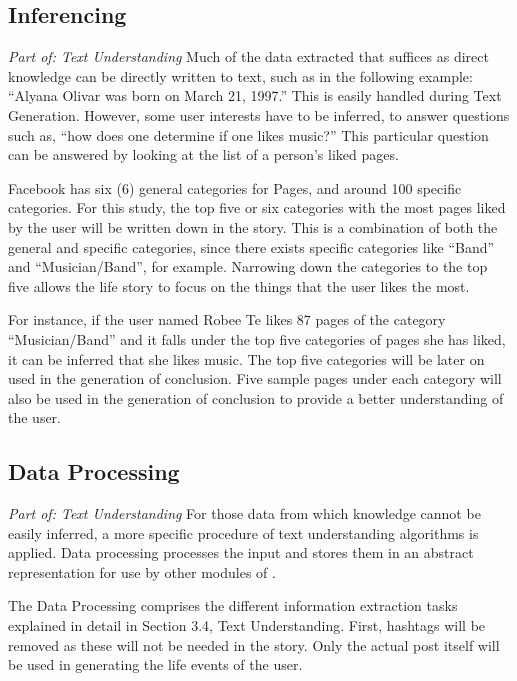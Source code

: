 \clearpage
\subsection{Inferencing}
\textit{Part of: Text Understanding} \newline \newline
Much of the data extracted that suffices as direct knowledge can be directly written to text, such as in the following example: ``Alyana Olivar was born on March 21, 1997.'' This is easily handled during Text Generation. However, some user interests have to be inferred, to answer questions such as, ``how does one determine if one likes music?'' This particular question can be answered by looking at the list of a person's liked pages.

Facebook has six (6) general categories for Pages, and around 100 specific categories. For this study, the top five or six categories with the most pages liked by the user will be written down in the story. This is a combination of both the general and specific categories, since there exists specific categories like ``Band'' and ``Musician/Band'', for example. Narrowing down the categories to the top five allows the life story to focus on the things that the user likes the most.

For instance, if the user named Robee Te likes 87 pages of the category ``Musician/Band'' and it falls under the top five categories of pages she has liked, it can be inferred that she likes music. The top five categories will be later on used in the generation of conclusion. Five sample pages under each category will also be used in the generation of conclusion to provide a better understanding of the user.

\subsection{Data Processing}
\textit{Part of: Text Understanding} \newline \newline
For those data from which knowledge cannot be easily inferred, a more specific procedure of text understanding algorithms is applied. Data processing processes the input and stores them in an abstract representation for use by other modules of \systemname.

The Data Processing comprises the different information extraction tasks explained in detail in Section 3.4, Text Understanding. First, hashtags will be removed as these will not be needed in the story. Only the actual post itself will be used in generating the life events of the user.


